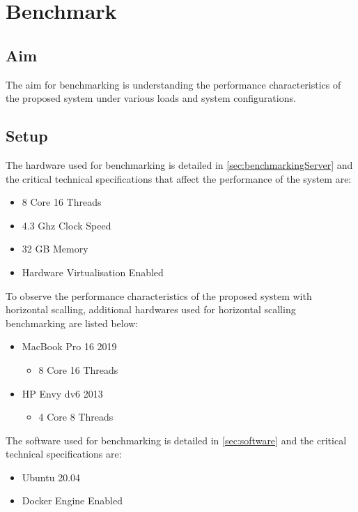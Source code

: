 \documentclass[../thesis.tex]{subfiles}
\begin{document}
\chapter{Benchmark}

\section{Aim}
The aim for benchmarking is understanding the performance characteristics of the proposed system under various loads and system configurations.

\section{Setup}

The hardware used for benchmarking is detailed in \autoref{sec:benchmarkingServer} and the critical technical specifications that affect the performance of the system are:
\begin{itemize}
	\item 8 Core 16 Threads
	\item 4.3 Ghz Clock Speed
	\item 32 GB Memory
	\item Hardware Virtualisation Enabled
\end{itemize}

To observe the performance characteristics of the proposed system with horizontal scalling, additional hardwares used for horizontal scalling benchmarking are listed below:
\begin{itemize}
	\item MacBook Pro 16 2019
		\begin{itemize}
			\item 8 Core 16 Threads
		\end{itemize}
	\item HP Envy dv6 2013
		\begin{itemize}
			\item 4 Core 8 Threads
		\end{itemize}
\end{itemize}


The software used for benchmarking is detailed in \autoref{sec:software} and the critical technical specifications are:
\begin{itemize}
	\item Ubuntu 20.04
	\item Docker Engine Enabled
\end{itemize}
\end{document}
